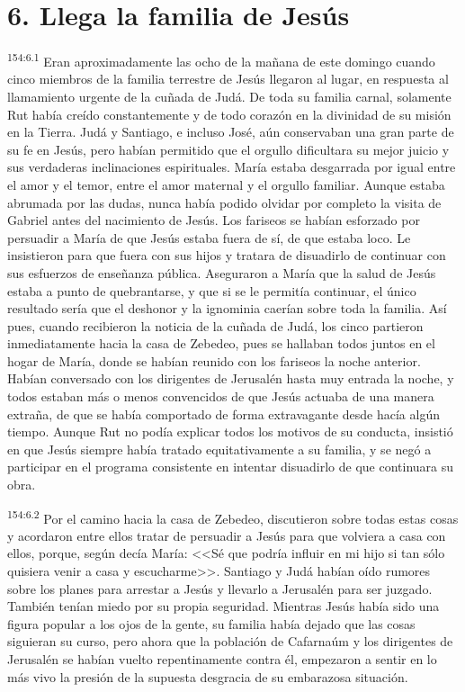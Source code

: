 \section*{6. Llega la familia de Jesús}
\par 
\textsuperscript{154:6.1} Eran aproximadamente las ocho de la mañana de este domingo cuando cinco miembros de la familia terrestre de Jesús llegaron al lugar, en respuesta al llamamiento urgente de la cuñada de Judá. De toda su familia carnal, solamente Rut había creído constantemente y de todo corazón en la divinidad de su misión en la Tierra. Judá y Santiago, e incluso José, aún conservaban una gran parte de su fe en Jesús, pero habían permitido que el orgullo dificultara su mejor juicio y sus verdaderas inclinaciones espirituales. María estaba desgarrada por igual entre el amor y el temor, entre el amor maternal y el orgullo familiar. Aunque estaba abrumada por las dudas, nunca había podido olvidar por completo la visita de Gabriel antes del nacimiento de Jesús. Los fariseos se habían esforzado por persuadir a María de que Jesús estaba fuera de sí, de que estaba loco. Le insistieron para que fuera con sus hijos y tratara de disuadirlo de continuar con sus esfuerzos de enseñanza pública. Aseguraron a María que la salud de Jesús estaba a punto de quebrantarse, y que si se le permitía continuar, el único resultado sería que el deshonor y la ignominia caerían sobre toda la familia. Así pues, cuando recibieron la noticia de la cuñada de Judá, los cinco partieron inmediatamente hacia la casa de Zebedeo, pues se hallaban todos juntos en el hogar de María, donde se habían reunido con los fariseos la noche anterior. Habían conversado con los dirigentes de Jerusalén hasta muy entrada la noche, y todos estaban más o menos convencidos de que Jesús actuaba de una manera extraña, de que se había comportado de forma extravagante desde hacía algún tiempo. Aunque Rut no podía explicar todos los motivos de su conducta, insistió en que Jesús siempre había tratado equitativamente a su familia, y se negó a participar en el programa consistente en intentar disuadirlo de que continuara su obra.

\par 
\textsuperscript{154:6.2} Por el camino hacia la casa de Zebedeo, discutieron sobre todas estas cosas y acordaron entre ellos tratar de persuadir a Jesús para que volviera a casa con ellos, porque, según decía María: <<Sé que podría influir en mi hijo si tan sólo quisiera venir a casa y escucharme>>. Santiago y Judá habían oído rumores sobre los planes para arrestar a Jesús y llevarlo a Jerusalén para ser juzgado. También tenían miedo por su propia seguridad. Mientras Jesús había sido una figura popular a los ojos de la gente, su familia había dejado que las cosas siguieran su curso, pero ahora que la población de Cafarnaúm y los dirigentes de Jerusalén se habían vuelto repentinamente contra él, empezaron a sentir en lo más vivo la presión de la supuesta desgracia de su embarazosa situación.

